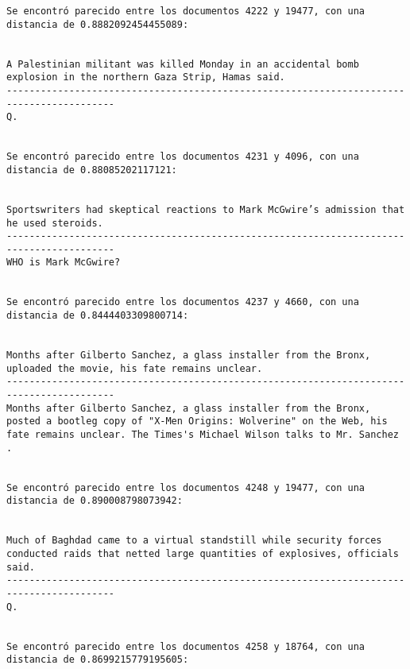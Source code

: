 \documentclass[11pt]{article}
\begin{document}
\begin{Verbatim}[commandchars=\\\{\}]
Se encontró parecido entre los documentos 4222 y 19477, con una distancia de 0.8882092454455089:


A Palestinian militant was killed Monday in an accidental bomb explosion in the northern Gaza Strip, Hamas said.
-----------------------------------------------------------------------------------------
Q.


Se encontró parecido entre los documentos 4231 y 4096, con una distancia de 0.88085202117121:


Sportswriters had skeptical reactions to Mark McGwire’s admission that he used steroids.
-----------------------------------------------------------------------------------------
WHO is Mark McGwire?


Se encontró parecido entre los documentos 4237 y 4660, con una distancia de 0.8444403309800714:


Months after Gilberto Sanchez, a glass installer from the Bronx, uploaded the movie, his fate remains unclear.
-----------------------------------------------------------------------------------------
Months after Gilberto Sanchez, a glass installer from the Bronx, posted a bootleg copy of "X-Men Origins: Wolverine" on the Web, his fate remains unclear. The Times's Michael Wilson talks to Mr. Sanchez .


Se encontró parecido entre los documentos 4248 y 19477, con una distancia de 0.890008798073942:


Much of Baghdad came to a virtual standstill while security forces conducted raids that netted large quantities of explosives, officials said.
-----------------------------------------------------------------------------------------
Q.


Se encontró parecido entre los documentos 4258 y 18764, con una distancia de 0.8699215779195605:



\end{Verbatim}
\end{document}
